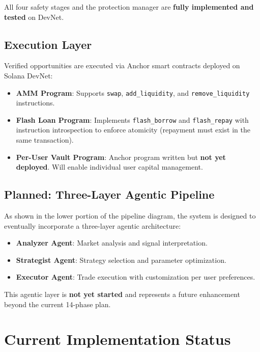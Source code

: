 \documentclass[12pt,a4paper]{article}
\begin{document}
All four safety stages and the protection manager are \textbf{fully implemented and tested} on DevNet.

\subsection{Execution Layer}

Verified opportunities are executed via Anchor smart contracts deployed on Solana DevNet:

\begin{itemize}[nosep]
    \item \textbf{AMM Program}: Supports \texttt{swap}, \texttt{add\_liquidity}, and \texttt{remove\_liquidity} instructions.
    \item \textbf{Flash Loan Program}: Implements \texttt{flash\_borrow} and \texttt{flash\_repay} with instruction introspection to enforce atomicity (repayment must exist in the same transaction).
    \item \textbf{Per-User Vault Program}: Anchor program written but \textbf{not yet deployed}. Will enable individual user capital management.
\end{itemize}

\subsection{Planned: Three-Layer Agentic Pipeline}

As shown in the lower portion of the pipeline diagram, the system is designed to eventually incorporate a three-layer agentic architecture:

\begin{itemize}[nosep]
    \item \textbf{Analyzer Agent}: Market analysis and signal interpretation.
    \item \textbf{Strategist Agent}: Strategy selection and parameter optimization.
    \item \textbf{Executor Agent}: Trade execution with customization per user preferences.
\end{itemize}

This agentic layer is \textbf{not yet started} and represents a future enhancement beyond the current 14-phase plan.

\section{Current Implementation Status}
\end{document}

